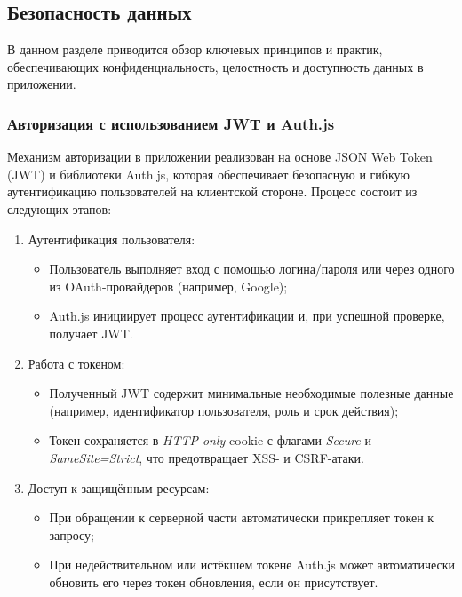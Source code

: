\subsection{Безопасность данных}

В данном разделе приводится обзор ключевых принципов и практик, обеспечивающих конфиденциальность, целостность и доступность данных в приложении.

\subsubsection{Авторизация с использованием JWT и Auth.js}
Механизм авторизации в приложении реализован на основе JSON Web Token (JWT) и библиотеки Auth.js, которая обеспечивает безопасную и гибкую аутентификацию пользователей на клиентской стороне. Процесс состоит из следующих этапов:
\begin{enumerate}
  \item Аутентификация пользователя:
    \begin{itemize}
      \item Пользователь выполняет вход с помощью логина/пароля или через одного из OAuth-провайдеров (например, Google);
      \item Auth.js инициирует процесс аутентификации и, при успешной проверке, получает JWT.
    \end{itemize}
  \item Работа с токеном:
    \begin{itemize}
      \item Полученный JWT содержит минимальные необходимые полезные данные  (например, идентификатор пользователя, роль и срок действия);
      \item Токен сохраняется в \textit{HTTP-only} cookie с флагами \textit{Secure} и \textit{SameSite=Strict}, что предотвращает XSS- и CSRF-атаки.
    \end{itemize}
  \item Доступ к защищённым ресурсам:
    \begin{itemize}
      \item При обращении к серверной части автоматически прикрепляет токен к запросу;
      \item При недействительном или истёкшем токене Auth.js может автоматически обновить его через токен обновления, если он присутствует.
    \end{itemize}
\end{enumerate}

